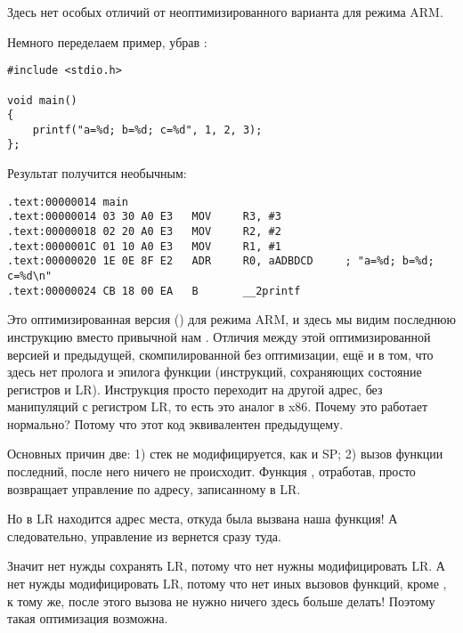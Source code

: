 Здесь нет особых отличий от неоптимизированного варианта для режима ARM.
\label{ARM_B_to_printf}

Немного переделаем пример, убрав :

\begin{lstlisting}
#include <stdio.h>

void main()
{
	printf("a=%d; b=%d; c=%d", 1, 2, 3);
};
\end{lstlisting}

Результат получится необычным:

\begin{lstlisting}[caption=\OptimizingKeilVI (\ARMMode)]
.text:00000014 main
.text:00000014 03 30 A0 E3   MOV     R3, #3
.text:00000018 02 20 A0 E3   MOV     R2, #2
.text:0000001C 01 10 A0 E3   MOV     R1, #1
.text:00000020 1E 0E 8F E2   ADR     R0, aADBDCD     ; "a=%d; b=%d; c=%d\n"
.text:00000024 CB 18 00 EA   B       __2printf
\end{lstlisting}

Это оптимизированная версия (\Othree) для режима ARM, и здесь мы видим последнюю инструкцию 
 вместо привычной нам .
Отличия между этой оптимизированной версией и предыдущей, скомпилированной без оптимизации, 
ещё и в том, что здесь нет пролога и эпилога функции (инструкций, сохраняющих состояние регистров  и \ac{LR}).
Инструкция  просто переходит на другой адрес, без манипуляций с регистром \ac{LR}, то есть это аналог \JMP в x86.
Почему это работает нормально? Потому что этот код эквивалентен предыдущему.

Основных причин две: 1) стек не модифицируется, как и  \ac{SP}; 2) вызов функции \printf последний, после него ничего не происходит.
Функция \printf, отработав, просто возвращает управление по адресу, записанному в \ac{LR}.

Но в \ac{LR} находится адрес места, откуда была вызвана наша функция!
А следовательно, управление из \printf вернется сразу туда.

Значит нет нужды сохранять \ac{LR}, потому что нет нужны модифицировать \ac{LR}.
А нет нужды модифицировать \ac{LR}, потому что нет иных вызовов функций, кроме \printf, к тому же, после этого вызова не нужно ничего здесь больше делать!
Поэтому такая оптимизация возможна.

